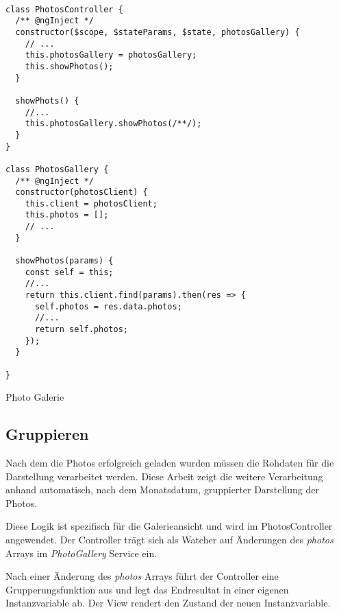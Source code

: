 \begin{listing}[H]
\begin{verbatim}

class PhotosController {
  /** @ngInject */
  constructor($scope, $stateParams, $state, photosGallery) {
    // ...
    this.photosGallery = photosGallery;
    this.showPhotos();
  }

  showPhots() {
    //...
    this.photosGallery.showPhotos(/**/);
  }
}

class PhotosGallery {
  /** @ngInject */
  constructor(photosClient) {
    this.client = photosClient;
    this.photos = [];
    // ...
  }
    
  showPhotos(params) {
    const self = this;
    //...
    return this.client.find(params).then(res => {
      self.photos = res.data.photos; 
      //...
      return self.photos;
    });
  }

}

\end{verbatim}
\caption{Photo Galerie}
\label{lst:photo_gallery}
\end{listing} 

\subsection{Gruppieren}

Nach dem die Photos erfolgreich geladen wurden müssen die Rohdaten für die Darstellung verarbeitet werden. Diese Arbeit zeigt die weitere Verarbeitung anhand automatisch, nach dem Monatsdatum, gruppierter Darstellung der Photos.

Diese Logik ist spezifisch für die Galerieansicht und wird im PhotosController angewendet. Der Controller trägt sich als Watcher auf Änderungen des \textit{photos} Arrays im \textit{PhotoGallery} Service ein. 

Nach einer Änderung des  \textit{photos} Arrays führt der Controller eine Grupperungsfunktion aus und legt das Endresultat in einer eigenen Instanzvariable ab. Der View rendert den Zustand der neuen Instanzvariable.

